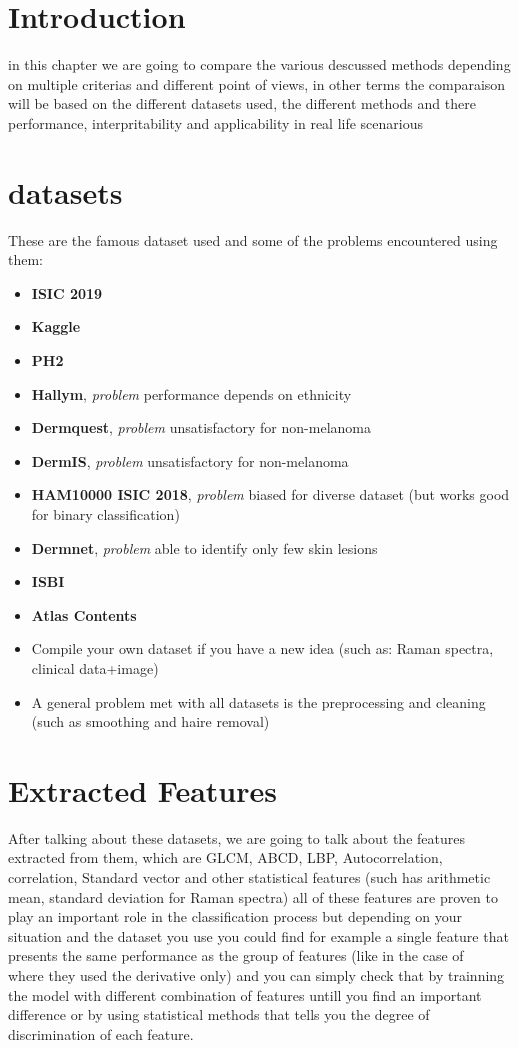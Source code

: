 \section{Introduction}
in this chapter we are going to compare the various descussed methods  depending on multiple criterias and different point of views, in other terms the comparaison will be based on the different datasets used, the different methods and there performance, interpritability and applicability in real life scenarious

\section{datasets}
    These are the famous dataset used and some of the problems encountered using them:\\ 
    \begin{itemize}
    \item \textbf{ISIC 2019}
    \item \textbf{Kaggle}
    \item \textbf{PH2}
    \item \textbf{Hallym}, \emph{problem} performance depends on ethnicity
    \item \textbf{Dermquest}, \emph{problem} unsatisfactory for non-melanoma
    \item \textbf{DermIS}, \emph{problem} unsatisfactory for non-melanoma
    \item \textbf{HAM10000 ISIC 2018}, \emph{problem} biased for diverse dataset (but works good for binary classification)
    \item \textbf{Dermnet}, \emph{problem} able to identify only few skin lesions
    \item \textbf{ISBI}
    \item \textbf{Atlas Contents}
    \item Compile your own dataset if you have a new idea (such as: Raman spectra, clinical data+image)
    \item A general problem met with all datasets is the preprocessing and cleaning (such as smoothing and haire removal)
\end{itemize}


\section{Extracted Features}
    After talking about these datasets, we are going to talk about the features extracted from them, which are GLCM, ABCD, LBP, Autocorrelation, correlation, Standard vector and other statistical features (such has arithmetic mean, standard deviation for Raman spectra) all of these features are proven to play an important role in the classification process but depending on your situation and the dataset you use you could find for example a single feature that presents the same performance as the group of features (like in the case of ~\cite{Daniella2021} where they used the derivative only) and you can simply check that by trainning the model with different combination of features untill you find an important difference or by using statistical methods that tells you the degree of discrimination of each feature.

